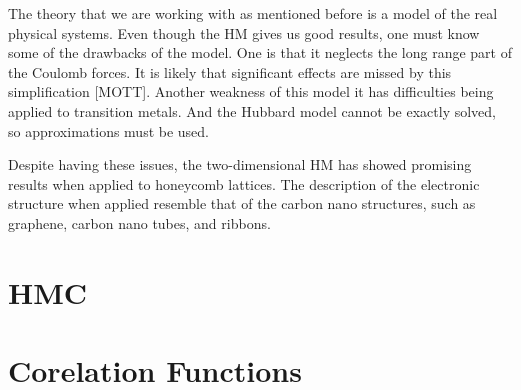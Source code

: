 The theory that we are working with as mentioned before is a model of the real physical systems. Even though the HM gives us good results, one must know some of the drawbacks of the model. One is that it neglects the long range part of the Coulomb forces. It is likely that significant effects are missed by this simplification [MOTT]. Another weakness of this model it has difficulties being applied to transition metals. And the Hubbard model cannot be exactly solved, so approximations must be used.

Despite having these issues, the two-dimensional HM has showed promising results when applied to honeycomb lattices. The description of the electronic structure when applied resemble that of the carbon nano structures, such as graphene, carbon nano tubes, and ribbons.


\section{HMC}



\section{Corelation Functions}
\label{sec:corr_func}

